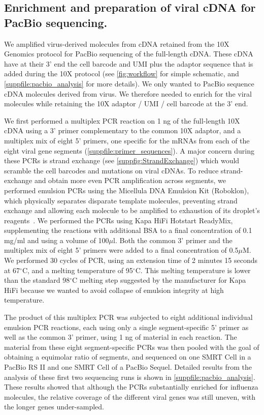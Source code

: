 \documentclass[]{asm-article}
\newcommand{\FIG}[1]{\autoref{fig:#1}}
\newcommand{\SUPPFILE}[1]{\autoref{suppfile:#1}}
\newcommand{\SUPPFIG}[1]{\autoref{suppfig:#1}}
\begin{document}
\subsection{Enrichment and preparation of viral cDNA for PacBio sequencing.}
We amplified virus-derived molecules from cDNA retained from the 10X Genomics protocol for PacBio sequencing of the full-length cDNA.
These cDNA have at their 3' end the cell barcode and UMI plus the adaptor sequence that is added during the 10X protocol (see \FIG{workflow} for simple schematic, and \SUPPFILE{pacbio_analysis} for more details). 
We only wanted to PacBio sequence cDNA molecules derived from virus.
We therefore needed to enrich for the viral molecules while retaining the 10X adaptor / UMI / cell barcode at the 3' end.

We first performed a multiplex PCR reaction on 1 ng of the full-length 10X cDNA using a 3' primer complementary to the common 10X adaptor, and a multiplex mix of eight 5' primers, one specific for the mRNAs from each of the eight viral gene segments (\SUPPFILE{primer_sequences}).
A major concern during these PCRs is strand exchange (see \SUPPFIG{StrandExchange}) which would scramble the cell barcodes and mutations on viral cDNAs.
To reduce strand-exchange and obtain more even PCR amplification across segments, we performed emulsion PCRs using the Micellula DNA Emulsion Kit (Roboklon), which physically separates disparate template molecules, preventing strand exchange and allowing each molecule to be amplified to exhaustion of its droplet's reagents~\cite{boers2015micelle}.
We performed the PCRs using Kapa HiFi Hotstart ReadyMix, supplementing the reactions with additional BSA to a final concentration of 0.1 mg/ml and using a volume of 100$\mu$l.
Both the common 3' primer and the multiplex mix of eight 5' primers were added to a final concentration of 0.5$\mu$M.
We performed 30 cycles of PCR, using an extension time of 2 minutes 15 seconds at 67$^{\circ}$C, and a melting temperature of 95$^{\circ}$C.
This melting temperature is lower than the standard 98$^{\circ}$C melting step suggested by the manufacturer for Kapa HiFi because we wanted to avoid collapse of emulsion integrity at high temperature.

The product of this multiplex PCR was subjected to eight additional individual emulsion PCR reactions, each using only a single segment-specific 5' primer as well as the common 3' primer, using 1 ng of material in each reaction.
The material from these eight segment-specific PCRs was then pooled with the goal of obtaining a equimolar ratio of segments, and sequenced on one SMRT Cell in a PacBio RS II and one SMRT Cell of a PacBio Sequel. 
Detailed results from the analysis of these first two sequencing runs is shown in \SUPPFILE{pacbio_analysis}.
These results showed that although the PCRs substantially enriched for influenza molecules, the relative coverage of the different viral genes was still uneven, with the longer genes under-sampled.
\end{document}

